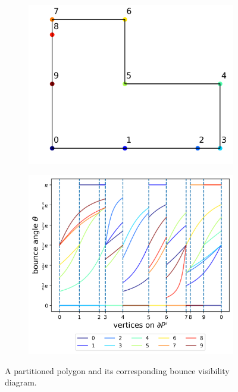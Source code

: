 \documentclass[]{styles/svproc}  %
\begin{document}
\begin{figure}
\centering
\begin{subfigure}{0.5\textwidth}
\centering
\includegraphics[width=\linewidth]{figures/L_poly.png}
\end{subfigure}%
\begin{subfigure}{0.5\textwidth}
\centering
\includegraphics[width=\linewidth]{figures/L_diagram.png}
\end{subfigure}
\caption{A partitioned polygon and its corresponding bounce visibility diagram. }
\label{fig:diagram}
\end{figure}
\end{document}
